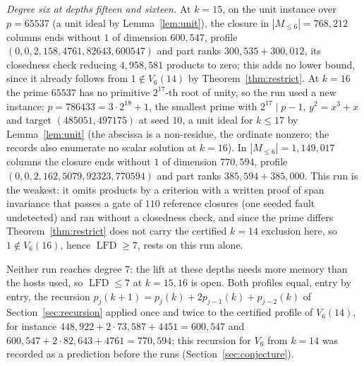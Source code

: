 \documentclass[11pt]{article}
\theoremstyle{definition}\newtheorem{definition}[theorem]{Definition}
\theoremstyle{remark}\newtheorem{remark}[theorem]{Remark}
\newcommand{\lfd}{\operatorname{LFD}}
\begin{document}
\emph{Degree six at depths fifteen and sixteen.} At $k=15$, on the unit
instance over $p=65537$ (a unit ideal by Lemma~\ref{lem:unit}), the closure
in $|M_{\le6}|=768{,}212$ columns ends without $1$ of dimension $600{,}547$,
profile $(0,0,2,158,4761,82643,600547)$ and part ranks $300{,}535+300{,}012$,
its closedness check reducing $4{,}958{,}581$ products to zero; this adds no
lower bound, since it already follows from $1\notin V_6(14)$ by
Theorem~\ref{thm:restrict}. At $k=16$ the prime $65537$ has no primitive
$2^{17}$-th root of unity, so the run used a new instance:
$p=786433=3\cdot2^{18}+1$, the smallest prime with $2^{17}\mid p-1$,
$y^2=x^3+x$ and target $(485051,497175)$ at seed $10$, a unit ideal for
$k\le17$ by Lemma~\ref{lem:unit} (the abscissa is a non-residue, the ordinate
nonzero; the records also enumerate no scalar solution at $k=16$). In
$|M_{\le6}|=1{,}149{,}017$ columns the closure ends without $1$ of dimension
$770{,}594$, profile $(0,0,2,162,5079,92323,770594)$ and part ranks
$385{,}594+385{,}000$. This run is the weakest: it omits products by a
criterion with a written proof of span invariance that passes a gate of $110$
reference closures (one seeded fault undetected) and ran without a closedness
check, and since the prime differs Theorem~\ref{thm:restrict} does not carry
the certified $k=14$ exclusion here, so $1\notin V_6(16)$, hence $\lfd\ge7$,
rests on this run alone.

Neither run reaches degree $7$: the lift at these depths needs more memory
than the hosts used, so $\lfd\le7$ at $k=15,16$ is open. Both profiles equal,
entry by entry, the recursion $p_j(k+1)=p_j(k)+2p_{j-1}(k)+p_{j-2}(k)$ of
Section~\ref{sec:recursion} applied once and twice to the certified profile
of $V_6(14)$, for instance $448{,}922+2\cdot73{,}587+4451=600{,}547$ and
$600{,}547+2\cdot82{,}643+4761=770{,}594$; this recursion for $V_6$ from
$k=14$ was recorded as a prediction before the runs
(Section~\ref{sec:conjecture}).
\end{document}
